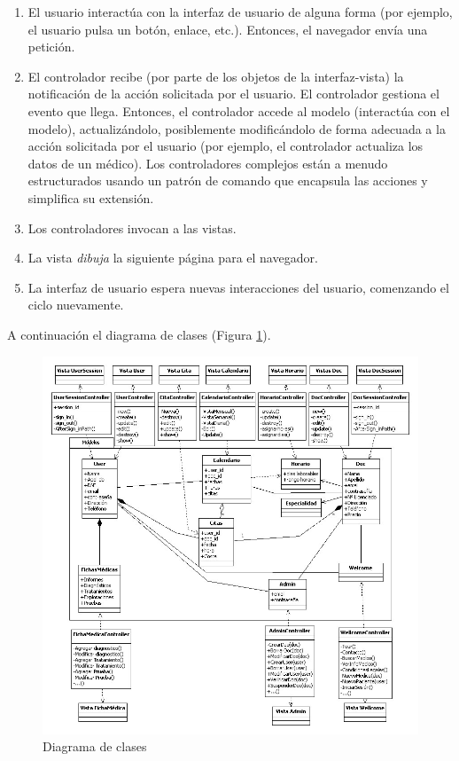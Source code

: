 \documentclass[a4paper,oneside,11pt]{book}
\begin{document}
		\begin{enumerate}
			\item El usuario interactúa con la interfaz de usuario de alguna forma (por ejemplo, el usuario pulsa un botón, enlace, etc.). Entonces, el navegador envía una petición.
			\item El controlador recibe (por parte de los objetos de la interfaz-vista) la notificación de la acción solicitada por el usuario. El controlador gestiona el evento que llega. Entonces, el controlador accede al modelo (interactúa con el modelo), actualizándolo, posiblemente modificándolo de forma adecuada a la acción solicitada por el usuario (por ejemplo, el controlador actualiza los datos de un médico). Los controladores complejos están a menudo estructurados usando un patrón de comando que encapsula las acciones y simplifica su extensión.
			\item Los controladores invocan a las vistas.
			\item La vista \textit{dibuja} la siguiente página para el navegador.
			\item La interfaz de usuario espera nuevas interacciones del usuario, comenzando el ciclo nuevamente.
		\end{enumerate}
		
		A continuación el diagrama de clases (Figura \ref{fig:dis_clases}).
		
		\begin{figure}[H]
		  \centering
		    \includegraphics[width=16cm]{img/jpg/dis_clases/clases.jpg}
		  \caption{Diagrama de clases}
		  \label{fig:dis_clases}
		\end{figure}
		
\end{document}
